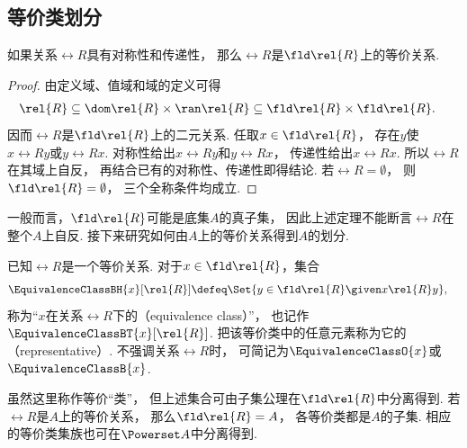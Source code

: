 \subsection{等价类划分}
\begin{theorem}\label{theorem:集合论.划分集合获得等价关系}
    如果关系\(\rel{R}\)具有对称性和传递性，
    那么\(\rel{R}\)是\(\fld\rel{R}\)上的等价关系.
    \begin{proof}
        由定义域、值域和域的定义可得
        \begin{align*}
            \rel{R}
            &\subseteq\dom\rel{R}\times\ran\rel{R}
            \subseteq\fld\rel{R}\times\fld\rel{R}.
        \end{align*}
        因而\(\rel{R}\)是\(\fld\rel{R}\)上的二元关系.
        任取\(x\in\fld\rel{R}\)，
        存在\(y\)使\(x\rel{R}y\)或\(y\rel{R}x\).
        对称性给出\(x\rel{R}y\)和\(y\rel{R}x\)，
        传递性给出\(x\rel{R}x\).
        所以\(\rel{R}\)在其域上自反，
        再结合已有的对称性、传递性即得结论.
        若\(\rel{R}=\emptyset\)，
        则\(\fld\rel{R}=\emptyset\)，
        三个全称条件均成立.
    \end{proof}
\end{theorem}
一般而言，\(\fld\rel{R}\)可能是底集\(A\)的真子集，
因此上述定理不能断言\(\rel{R}\)在整个\(A\)上自反.
接下来研究如何由\(A\)上的等价关系得到\(A\)的划分.

\begin{definition}
    已知\(\rel{R}\)是一个等价关系.
    对于\(x\in\fld\rel{R}\)，集合
    \begin{align*}
        \EquivalenceClassBH{x}[\rel{R}]
        &\defeq\Set{y\in\fld\rel{R}\given x\rel{R}y},
    \end{align*}
    称为“\(x\)在关系\(\rel{R}\)下的（equivalence class）”，
    也记作\(\EquivalenceClassBT{x}[\rel{R}]\).
    把该等价类中的任意元素称为它的（representative）.
    不强调关系\(\rel{R}\)时，
    可简记为\(\EquivalenceClassO{x}\)或\(\EquivalenceClassB{x}\).
\end{definition}
虽然这里称作等价“类”，
但上述集合可由子集公理在\(\fld\rel{R}\)中分离得到.
若\(\rel{R}\)是\(A\)上的等价关系，
那么\(\fld\rel{R}=A\)，
各等价类都是\(A\)的子集.
相应的等价类集族也可在\(\Powerset A\)中分离得到.

